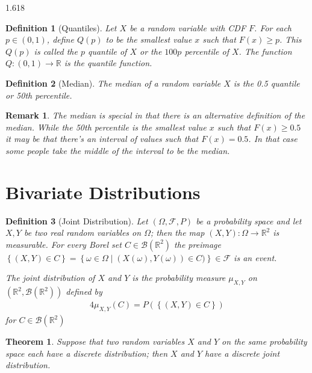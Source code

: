 \documentclass[11pt, oneside]{book}   	%
\newtheorem{definition}{Definition}[chapter]
\newtheorem{remark}{Remark}[chapter]
\newtheorem{theorem}{Theorem}[chapter]
\newcommand{\set}[1]{\left\{#1\right\}}
\begin{document}
\begin{spacing}{1.618}
		\begin{definition}[Quantiles]
			Let $X$ be a random variable with CDF $F$. For each $p\in(0, 1)$, define $Q(p)$ to be the smallest value $x$ such that $F(x) \geq p$. This $Q(p)$ is called the $p$ \emph{quantile} of $X$ or the $100p$ \emph{percentile} of $X$. The function $Q:(0, 1)\to \mathbb{R}$ is the \emph{quantile function}. 
		\end{definition}
		
		\begin{definition}[Median]
			The median of a random variable $X$ is the 0.5 quantile or 50th percentile. 
		\end{definition}
		
		\begin{remark}
			The median is special in that there is an alternative definition of the median. While the 50th percentile is the smallest value $x$ such that $F(x)\geq 0.5$ it may be that there's an interval of values such that $F(x)=0.5$. In that case some people take the middle of the interval to be the median. 
		\end{remark}
		
		
	\section{Bivariate Distributions}
		\begin{definition}[Joint Distribution]
			Let $(\Omega, \mathcal{F}, P)$ be a probability space and let $X, Y$ be two real random variables on $\Omega$; then the map $(X, Y): \Omega \to \mathbb{R}^2$ is measurable. For every Borel set $C\in\mathcal{B}(\mathbb{R}^2)$ the preimage $\set{(X, Y)\in C} = \set{\omega\in\Omega\mid (X(\omega), Y(\omega))\in C)}\in\mathcal{F}$ is an event. 
			
			The \emph{joint distribution} of $X$ and $Y$ is the probability measure $\mu_{X, Y}$ on $(\mathbb{R}^2, \mathcal{B}(\mathbb{R}^2))$ defined by 
			\begin{alignat}{4}
				\mu_{X, Y}(C) = P(\set{(X, Y)\in C})
			\end{alignat}
			for $C\in\mathcal{B}(\mathbb{R}^2)$
		\end{definition}

		\begin{theorem}
			Suppose that two random variables $X$ and $Y$ on the same probability space each have a discrete distribution; then $X$ and $Y$ have a discrete joint distribution. 
		\end{theorem}


\end{spacing}
\end{document}
